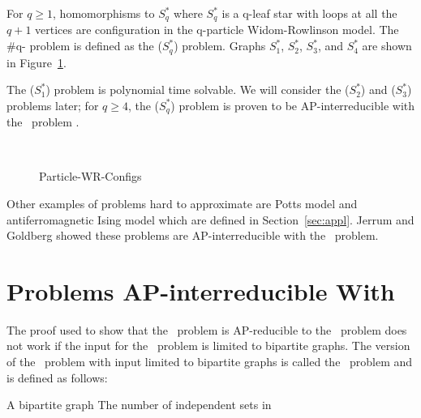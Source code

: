 \begin{example}  \label{exm:particles}
For \(q \ge 1\), homomorphisms to \(S^*_q\) where
\(S^*_q\) is a q-leaf star with loops at all the \(q+1\)
vertices are configuration in the q-particle Widom-Rowlinson model.
The \#q- problem is defined as the \chom(\(S^*_q\)) problem.
Graphs \(S^*_1\), \(S^*_2\), \(S^*_3\), and \(S^*_4\) are shown in Figure~\ref{fig:wrconfigs}.
 
The \chom(\(S^*_1\)) problem is polynomial time solvable.
We will consider the \chom(\(S^*_2\)) and \chom(\(S^*_3\)) problems later;
for \(q \ge 4\), the \chom(\(S^*_q\)) problem is proven to be AP-interreducible
with the \csat\ problem \cite{Leslie03}.
\end{example}

\begin{figure}[h]
\centering 
\subfigure[\ensuremath{S^*_1}]{\label{fig:ss1}}\hspace{5cm}
\subfigure[\ensuremath{S^*_2}]{\label{fig:ss2}}\\
\subfigure[\ensuremath{S^*_3}]{\label{fig:ss3}}\hspace{5cm}
\subfigure[\ensuremath{S^*_4}]{\label{fig:ss4}}
\caption{Particle-WR-Configs}
\label{fig:wrconfigs}
\end{figure}

Other examples of problems hard to approximate are Potts model
and antiferromagnetic Ising model which are defined in Section~\ref{sec:appl}. 
Jerrum and Goldberg \cite{Goldberg2007} showed these problems are 
AP-interreducible with the \csat\ problem.

\section{Problems AP-interreducible With \cbis}
The proof used to show that the \csat\ problem is AP-reducible to the \cis\ problem does
not work if the input for the \cis\ problem is limited to bipartite graphs.
The version of the \cis\ problem with input limited to bipartite graphs is called
the \cbis\ problem and is defined as follows:

\pnndef%
{A bipartite graph \mG}
{The number of independent sets in \mG}

